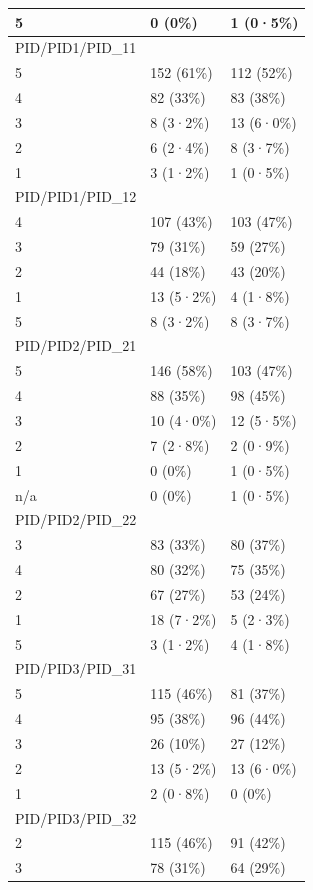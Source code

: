 \documentclass[
]{book}
\begin{document}
\begin{tabular}{l|l|l}
\hline
5 & 0 (0\%) & 1 (0·5\%)\\
\hline
PID/PID1/PID\_11 &  & \\
\hline
5 & 152 (61\%) & 112 (52\%)\\
\hline
4 & 82 (33\%) & 83 (38\%)\\
\hline
3 & 8 (3·2\%) & 13 (6·0\%)\\
\hline
2 & 6 (2·4\%) & 8 (3·7\%)\\
\hline
1 & 3 (1·2\%) & 1 (0·5\%)\\
\hline
PID/PID1/PID\_12 &  & \\
\hline
4 & 107 (43\%) & 103 (47\%)\\
\hline
3 & 79 (31\%) & 59 (27\%)\\
\hline
2 & 44 (18\%) & 43 (20\%)\\
\hline
1 & 13 (5·2\%) & 4 (1·8\%)\\
\hline
5 & 8 (3·2\%) & 8 (3·7\%)\\
\hline
PID/PID2/PID\_21 &  & \\
\hline
5 & 146 (58\%) & 103 (47\%)\\
\hline
4 & 88 (35\%) & 98 (45\%)\\
\hline
3 & 10 (4·0\%) & 12 (5·5\%)\\
\hline
2 & 7 (2·8\%) & 2 (0·9\%)\\
\hline
1 & 0 (0\%) & 1 (0·5\%)\\
\hline
n/a & 0 (0\%) & 1 (0·5\%)\\
\hline
PID/PID2/PID\_22 &  & \\
\hline
3 & 83 (33\%) & 80 (37\%)\\
\hline
4 & 80 (32\%) & 75 (35\%)\\
\hline
2 & 67 (27\%) & 53 (24\%)\\
\hline
1 & 18 (7·2\%) & 5 (2·3\%)\\
\hline
5 & 3 (1·2\%) & 4 (1·8\%)\\
\hline
PID/PID3/PID\_31 &  & \\
\hline
5 & 115 (46\%) & 81 (37\%)\\
\hline
4 & 95 (38\%) & 96 (44\%)\\
\hline
3 & 26 (10\%) & 27 (12\%)\\
\hline
2 & 13 (5·2\%) & 13 (6·0\%)\\
\hline
1 & 2 (0·8\%) & 0 (0\%)\\
\hline
PID/PID3/PID\_32 &  & \\
\hline
2 & 115 (46\%) & 91 (42\%)\\
\hline
3 & 78 (31\%) & 64 (29\%)\\

\end{tabular}
\end{document}
